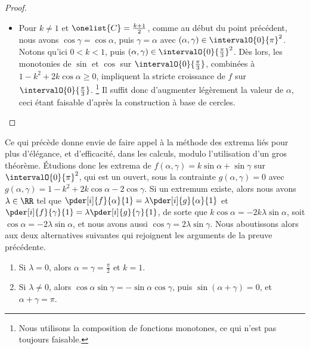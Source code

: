 \begin{proof}
\begin{itemize}
        \item Pour $k \neq 1$ et $\onelist{C} = \frac{k + 1}{2}$,
        comme au début du point précédent,
        nous avons $\cos \gamma = \cos \alpha$, puis $\gamma = \alpha$ avec $(\alpha , \gamma) \in \intervalO{0}{\pi}^2$.
        Notons qu'ici $0 < k < 1$, puis $(\alpha , \gamma) \in \intervalO{0}{\frac{\pi}{3}}^2$.
        Dès lors, les monotonies de $\sin$ et $\cos$ sur $\intervalO{0}{\frac{\pi}{3}}$, combinées à $1 - k^2 + 2 k \cos \alpha \geq 0$, impliquent la stricte croissance de $f$ sur $\intervalO{0}{\frac{\pi}{3}}$.%
        \footnote{
            Nous utilisons la composition de fonctions monotones, ce qui n'est pas toujours faisable.
        }
        Il suffit donc d'augmenter légèrement la valeur de  $\alpha$, ceci étant faisable d'après la construction à base de cercles.
    \end{itemize}

    \null\vspace{-6ex}
\end{proof}


\begin{remark}
    Ce qui précède donne envie de faire appel à la méthode des extrema liés pour plus d'élégance, et d'efficacité, dans les calculs, modulo l'utilisation d'un gros théorème.
    Étudions donc les extrema de
    $f(\alpha , \gamma) = k \sin \alpha + \sin \gamma$
    sur $\intervalO{0}{\pi}^2$, qui est un ouvert,
    sous la contrainte $g(\alpha , \gamma) = 0$
    avec
    $g(\alpha , \gamma) = 1 - k^2 + 2 k \cos \alpha - 2 \cos \gamma$.
    Si un extremum existe, alors nous avons $\lambda \in \RR$ tel que
    $\pder[i]{f}{\alpha}{1} = \lambda \pder[i]{g}{\alpha}{1}$
    et
    $\pder[i]{f}{\gamma}{1} = \lambda \pder[i]{g}{\gamma}{1}$,
    de sorte que
    $k \cos \alpha = - 2 k \lambda \sin \alpha$,
    soit
    $\cos \alpha = - 2 \lambda \sin \alpha$,
    et nous avons aussi
    $\cos \gamma = 2 \lambda \sin \gamma$.
    Nous aboutissons alors aux deux alternatives suivantes qui rejoignent les arguments de la preuve précédente.
    \begin{enumerate}
        \item Si $\lambda = 0$,
        alors
        $\alpha = \gamma = \frac{\pi}{2}$ et $k = 1$.

        \item Si $\lambda \neq 0$,
        alors
        $\cos \alpha \sin \gamma = - \sin \alpha \cos \gamma$,
        puis
        $\sin (\alpha + \gamma) = 0$,
        et
        $\alpha + \gamma = \pi$.
    \end{enumerate}
\end{remark}


